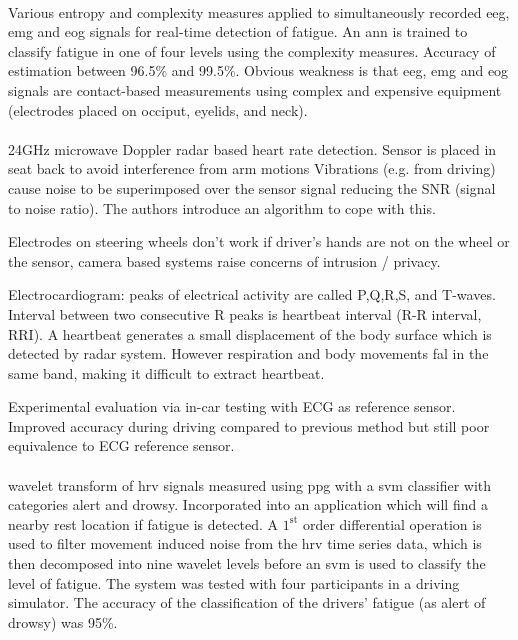 \documentclass[11pt, parskip=half*,twoside=false]{scrbook}
\begin{document}
\paragraph{\citet{zhangAutomatedDetectionDriver2014}} Various entropy and complexity measures applied to simultaneously recorded \gls{eeg}, \gls{emg} and \gls{eog} signals for real-time detection of fatigue. An \gls{ann} is trained to classify fatigue in one of four levels using the complexity measures. Accuracy of estimation between 96.5\% and 99.5\%. Obvious weakness is that \gls{eeg}, \gls{emg} and \gls{eog} signals are contact-based measurements using complex and expensive equipment (electrodes placed on occiput, eyelids, and neck). 

\paragraph{\citet{tsuchiyaHeartbeatDetectionTechnology2020}} 24GHz microwave Doppler radar based heart rate detection. Sensor is placed in seat back to avoid interference from arm motions  Vibrations (e.g. from driving) cause noise to be superimposed over the sensor signal reducing the SNR (signal to noise ratio). The authors introduce an algorithm to cope with this. 

Electrodes on steering wheels don't work if driver's hands are not on the wheel or the sensor, camera based systems raise concerns of intrusion / privacy. 

Electrocardiogram: peaks of electrical activity are called P,Q,R,S, and T-waves. Interval between two consecutive R peaks is heartbeat interval (R-R interval, RRI). A heartbeat generates a small displacement of the body surface which is detected by radar system. However  respiration and body movements fal in the same band, making it difficult to extract heartbeat.

Experimental evaluation via in-car testing with ECG as reference sensor. Improved accuracy during driving compared to previous method but still poor equivalence to ECG reference sensor.

\paragraph{\citet{liDetectionDriverDrowsiness2013}} wavelet transform of \gls{hrv} signals measured using \gls{ppg} with a \gls{svm} classifier with categories alert and drowsy. Incorporated into an application which will find a nearby rest location if fatigue is detected. A $1^\text{st}$ order differential operation is used to filter movement induced noise from the  \gls{hrv} time series data, which is then decomposed into nine wavelet levels before an \gls{svm} is used to classify the level of fatigue. The system was tested with four participants in a driving simulator. The accuracy of the classification of the drivers' fatigue (as alert of drowsy) was 95\%.
\end{document}
